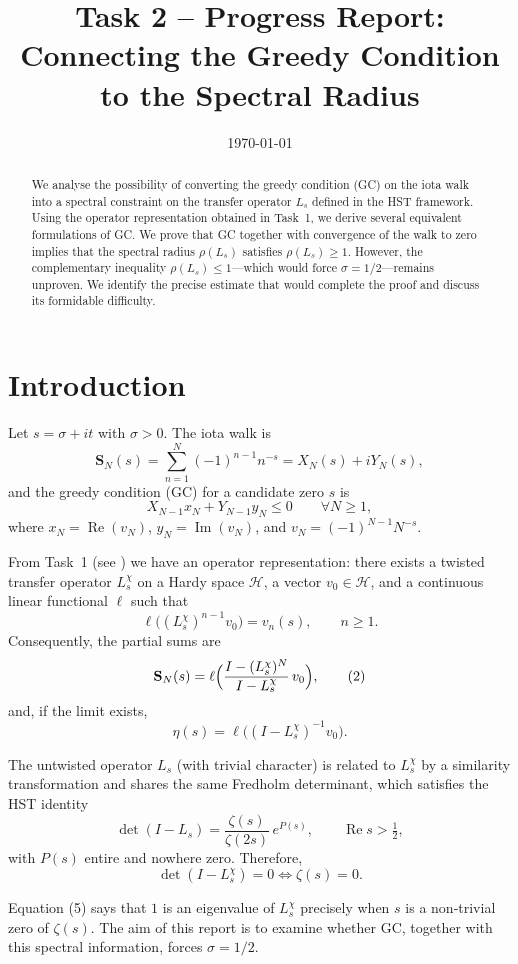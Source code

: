 \documentclass[11pt,a4paper]{article}
\title{\bf Task 2 -- Progress Report: \\
Connecting the Greedy Condition to the Spectral Radius}
\author{}
\date{\today}
\newcommand{\RE}{\operatorname{Re}}
\newcommand{\IM}{\operatorname{Im}}
\begin{document}
\maketitle

\begin{abstract}
We analyse the possibility of converting the greedy condition (GC) on the iota walk into a spectral constraint on the transfer operator $L_s$ defined in the HST framework.  Using the operator representation obtained in Task~1, we derive several equivalent formulations of GC.  We prove that GC together with convergence of the walk to zero implies that the spectral radius $\rho(L_s)$ satisfies $\rho(L_s) \ge 1$.  However, the complementary inequality $\rho(L_s) \le 1$—which would force $\sigma = 1/2$—remains unproven.  We identify the precise estimate that would complete the proof and discuss its formidable difficulty.
\end{abstract}

\section{Introduction}
Let $s = \sigma + it$ with $\sigma > 0$.  The iota walk is
\[
\mathbf{S}_N(s) = \sum_{n=1}^{N} (-1)^{n-1} n^{-s} = X_N(s) + i Y_N(s),
\]
and the greedy condition (GC) for a candidate zero $s$ is
\[
X_{N-1} x_N + Y_{N-1} y_N \le 0 \qquad \forall N\ge 1,
\tag{GC}
\]
where $x_N = \RE(v_N)$, $y_N = \IM(v_N)$, and $v_N = (-1)^{N-1} N^{-s}$.

From Task~1 (see \cite{Task1}) we have an operator representation: there exists a twisted transfer operator $L_s^{\chi}$ on a Hardy space $\mathcal{H}$, a vector $v_0 \in \mathcal{H}$, and a continuous linear functional $\ell$ such that
\[
\ell\bigl( (L_s^{\chi})^{n-1} v_0 \bigr) = v_n(s), \qquad n\ge 1.
\tag{1}
\]
Consequently, the partial sums are
\[
\mathbf{S}_N(s) = \ell\Bigl( \frac{I - (L_s^{\chi})^{N}}{I - L_s^{\chi}} \, v_0 \Bigr),
\tag{2}
\]
and, if the limit exists,
\[
\eta(s) = \ell\bigl( (I - L_s^{\chi})^{-1} v_0 \bigr).
\tag{3}
\]

The untwisted operator $L_s$ (with trivial character) is related to $L_s^{\chi}$ by a similarity transformation and shares the same Fredholm determinant, which satisfies the HST identity
\[
\det(I - L_s) = \frac{\zeta(s)}{\zeta(2s)}\, e^{P(s)},
\qquad \RE s > \tfrac12,
\tag{4}
\]
with $P(s)$ entire and nowhere zero.  Therefore,
\[
\det(I - L_s^{\chi}) = 0 \iff \zeta(s) = 0.
\tag{5}
\]

Equation (5) says that $1$ is an eigenvalue of $L_s^{\chi}$ precisely when $s$ is a non‑trivial zero of $\zeta(s)$.  The aim of this report is to examine whether GC, together with this spectral information, forces $\sigma = 1/2$.
\end{document}
